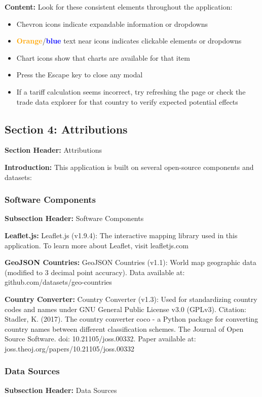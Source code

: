 \documentclass[11pt]{article}
\begin{document}
\textbf{Content:} 
Look for these consistent elements throughout the application:
\begin{itemize}
    \item Chevron icons indicate expandable information or dropdowns
    \item \textcolor{orange}{\textbf{Orange}}/\textcolor{blue}{\textbf{blue}} text near icons indicates clickable elements or dropdowns
    \item Chart icons show that charts are available for that item
    \item Press the Escape key to close any modal
    \item If a tariff calculation seems incorrect, try refreshing the page or check the trade data explorer for that country to verify expected potential effects
\end{itemize}

\subsection{Section 4: Attributions}
\textbf{Section Header:} Attributions

\textbf{Introduction:} This application is built on several open-source components and datasets:

\subsubsection{Software Components}
\textbf{Subsection Header:} Software Components

\textbf{Leaflet.js:} Leaflet.js (v1.9.4): The interactive mapping library used in this application. To learn more about Leaflet, visit leafletjs.com

\textbf{GeoJSON Countries:} GeoJSON Countries (v1.1): World map geographic data (modified to 3 decimal point accuracy). Data available at: github.com/datasets/geo-countries

\textbf{Country Converter:} Country Converter (v1.3): Used for standardizing country codes and names under GNU General Public License v3.0 (GPLv3). Citation: Stadler, K. (2017). The country converter coco - a Python package for converting country names between different classification schemes. The Journal of Open Source Software. doi: 10.21105/joss.00332. Paper available at: joss.theoj.org/papers/10.21105/joss.00332

\subsubsection{Data Sources}
\textbf{Subsection Header:} Data Sources
\end{document}
